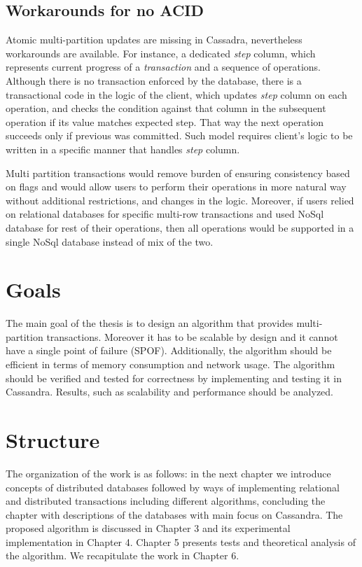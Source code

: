 \subsection{Workarounds for no ACID}
Atomic multi-partition updates are missing in Cassadra, nevertheless workarounds are available. For instance, a dedicated \emph{step} column, which represents current progress of a \emph{transaction} and a sequence of \lwt operations. Although there is no transaction enforced by the database, there is a transactional code in the logic of the client, which updates \emph{step} column on each operation, and checks the condition against that column in the subsequent operation if its value matches expected step. That way the next operation succeeds only if previous was committed. 
Such model requires client's logic to be written in a specific manner that handles \emph{step} column. 

Multi partition transactions would remove burden of ensuring consistency based on flags and would allow users to perform their operations in more natural way without additional restrictions, and changes in the logic. Moreover, if users relied on relational databases for specific multi-row transactions and used NoSql database for rest of their operations, then all operations would be supported in a single NoSql database instead of mix of the two.

\section{Goals}
The main goal of the thesis is to design an algorithm that provides multi-partition transactions. Moreover it has to be scalable by design and it cannot have a single point of failure (SPOF). Additionally, the algorithm should be efficient in terms of memory consumption and network usage. The algorithm should be verified and tested for correctness by implementing and testing it in Cassandra. Results, such as scalability and performance should be analyzed.

 
\section{Structure}\label{sec:introduction:structure}
The organization of the work is as follows: 
in the next chapter we introduce concepts of distributed databases followed by ways of implementing relational and distributed transactions including different algorithms, concluding the chapter with descriptions of the databases with main focus on Cassandra. 
The proposed algorithm is discussed in Chapter 3 and its experimental implementation in Chapter 4.
Chapter 5 presents tests and theoretical analysis of the algorithm.
We recapitulate the work in Chapter 6.

